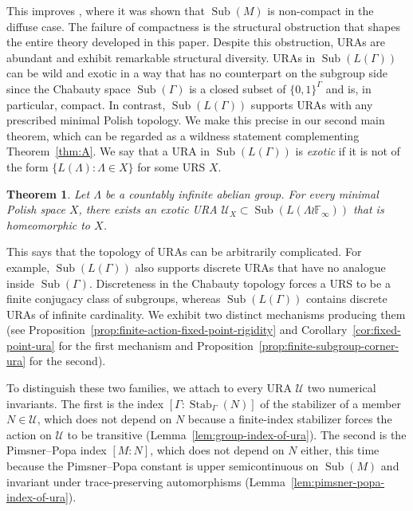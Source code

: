 \documentclass[12pt]{amsart} %
\theoremstyle{plain}
\newtheorem{theoremA}{Theorem}
\theoremstyle{definition}
\newcommand{\Ucal}{\mathcal{U}}
\DeclareMathOperator{\Sub}{Sub}
\DeclareMathOperator{\Stab}{Stab}
\begin{document}
This improves \cite[Theorem 2.5]{AJ}, where it was shown that $\Sub(M)$ is non-compact in the diffuse case. The failure of compactness is the structural obstruction that shapes the entire theory developed in this paper. Despite this obstruction, URAs are abundant and exhibit remarkable structural diversity. URAs in $\Sub(L(\Gamma))$ can be wild and exotic in a way that has no counterpart on the subgroup side since the Chabauty space $\Sub(\Gamma)$ is a closed subset of $\{0,1\}^\Gamma$ and is, in particular, compact. In contrast, $\Sub(L(\Gamma))$ supports URAs with any prescribed minimal Polish topology. We make this precise in our second main theorem, which can be regarded as a wildness statement complementing Theorem~\ref{thm:A}. We say that a URA in $\Sub(L(\Gamma))$ is \emph{exotic} if it is not of the form $\{L(\Lambda) : \Lambda \in X\}$ for some URS $X$.
\begin{theoremA}\label{thm:B}
Let $\Lambda$ be a countably infinite abelian group. For every minimal Polish space $X$, there exists an exotic URA $\mathcal{U}_X \subset \Sub(L(\Lambda \wr \mathbb{F}_\infty))$ that is homeomorphic to $X$.
\end{theoremA}
\noindent This says that the topology of URAs can be arbitrarily complicated. For example, $\Sub(L(\Gamma))$ also supports discrete URAs that have no analogue inside $\Sub(\Gamma)$. Discreteness in the Chabauty topology forces a URS to be a finite conjugacy class of subgroups, whereas $\Sub(L(\Gamma))$ contains discrete URAs of infinite cardinality. We exhibit two distinct mechanisms producing them (see Proposition~\ref{prop:finite-action-fixed-point-rigidity} and Corollary~\ref{cor:fixed-point-ura} for the first mechanism and Proposition~\ref{prop:finite-subgroup-corner-ura} for the second).

To distinguish these two families, we attach to every URA $\Ucal$ two numerical invariants. The first is the index $[\Gamma:\Stab_\Gamma(N)]$ of the stabilizer of a member $N\in\Ucal$, which does not depend on $N$ because a finite-index stabilizer forces the action on $\Ucal$ to be transitive (Lemma~\ref{lem:group-index-of-ura}). The second is the Pimsner--Popa index $[M:N]$, which does not depend on $N$ either, this time because the Pimsner--Popa constant is upper semicontinuous on $\Sub(M)$ and invariant under trace-preserving automorphisms (Lemma~\ref{lem:pimsner-popa-index-of-ura}).
\end{document}
